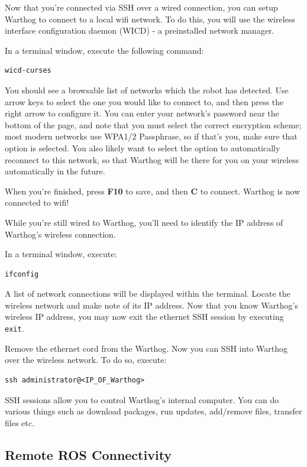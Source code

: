 \documentclass[]{clearpath-latex/clearpath-manual}
\begin{document}
Now that you're connected via SSH over a wired connection, you can setup Warthog to connect to a local wifi network.  To do this, you will use the wireless interface configuration daemon (WICD) - a preinstalled network manager.

In a terminal window, execute the following command:

\begin{lstlisting}
wicd-curses
\end{lstlisting}

You should see a browsable list of networks which the robot has detected. Use arrow keys to select the one you would like to connect to, and then press the right arrow to configure it. You can enter your network’s password near the bottom of the page, and note that you must select the correct encryption scheme; most modern networks use WPA1/2 Passphrase, so if that’s you, make sure that option is selected. You also likely want to select the option to automatically reconnect to this network, so that Warthog will be there for you on your wireless automatically in the future.

When you’re finished, press \textbf{F10} to save, and then \textbf{C} to connect.  Warthog is now connected to wifi!

While you're still wired to Warthog, you'll need to identify the IP address of Warthog's wireless connection.

In a terminal window, execute:

\begin{lstlisting}
ifconfig
\end{lstlisting}

A list of network connections will be displayed within the terminal.  Locate the wireless network and make note of its IP address. Now that you know Warthog's wireless IP address, you may now exit the ethernet SSH session by executing \lstinline{exit}.

Remove the ethernet cord from the Warthog.   Now you can SSH into Warthog over the wireless network.  To do so, execute:

\begin{lstlisting}
ssh administrator@<IP_OF_Warthog>
\end{lstlisting}

SSH sessions allow you to control Warthog's internal computer.  You can do various things such as download packages, run updates, add/remove files, transfer files etc.

\subsection{Remote ROS Connectivity}
\end{document}
